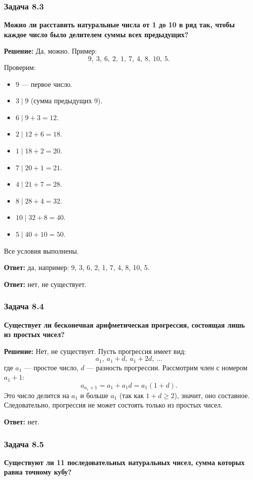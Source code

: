 \documentclass[12pt, a4paper]{article}
\begin{document}
\subsubsection*{Задача 8.3}
\textbf{Можно ли расставить натуральные числа от 1 до 10 в ряд так, чтобы каждое число было делителем суммы всех предыдущих?}

\textbf{Решение:}
Да, можно. Пример:
\[
9,\ 3,\ 6,\ 2,\ 1,\ 7,\ 4,\ 8,\ 10,\ 5.
\]
Проверим:
\begin{itemize}
    \item $9$ — первое число.
    \item $3 \mid 9$ (сумма предыдущих 9).
    \item $6 \mid 9+3 = 12$.
    \item $2 \mid 12+6 = 18$.
    \item $1 \mid 18+2 = 20$.
    \item $7 \mid 20+1 = 21$.
    \item $4 \mid 21+7 = 28$.
    \item $8 \mid 28+4 = 32$.
    \item $10 \mid 32+8 = 40$.
    \item $5 \mid 40+10 = 50$.
\end{itemize}
Все условия выполнены.

\textbf{Ответ:} да, например: 9, 3, 6, 2, 1, 7, 4, 8, 10, 5.

\textbf{Ответ:} нет, не существует.

\subsubsection*{Задача 8.4}
\textbf{Существует ли бесконечная арифметическая прогрессия, состоящая лишь из простых чисел?}

\textbf{Решение:}
Нет, не существует. Пусть прогрессия имеет вид:
\[
a_1,\ a_1 + d,\ a_1 + 2d,\ \ldots
\]
где $a_1$ — простое число, $d$ — разность прогрессии. Рассмотрим член с номером $a_1 + 1$:
\[
a_{a_1+1} = a_1 + a_1 d = a_1(1 + d).
\]
Это число делится на $a_1$ и больше $a_1$ (так как $1 + d \ge 2$), значит, оно составное. Следовательно, прогрессия не может состоять только из простых чисел.

\textbf{Ответ:} нет.

\subsubsection*{Задача 8.5}
\textbf{Существуют ли 11 последовательных натуральных чисел, сумма которых равна точному кубу?}
\end{document}
